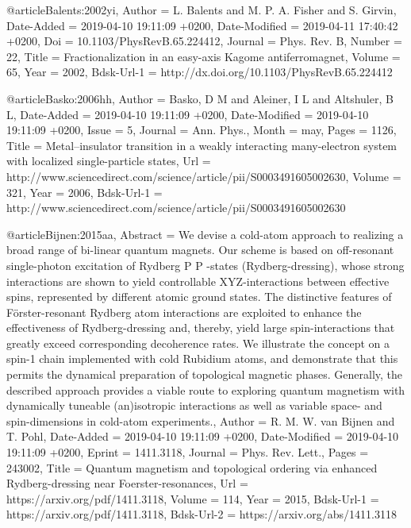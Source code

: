 \documentclass[epj,final]{svjour}
\begin{document}
{@article{Balents:2002yi,
	Author = {L. Balents and M. P. A. Fisher and S. Girvin},
	Date-Added = {2019-04-10 19:11:09 +0200},
	Date-Modified = {2019-04-11 17:40:42 +0200},
	Doi = {10.1103/PhysRevB.65.224412},
	Journal = {Phys. Rev. B},
	Number = {22},
	Title = {Fractionalization in an easy-axis Kagome antiferromagnet},
	Volume = {65},
	Year = {2002},
	Bdsk-Url-1 = {http://dx.doi.org/10.1103/PhysRevB.65.224412}}

@article{Basko:2006hh,
	Author = {Basko, D M and Aleiner, I L and Altshuler, B L},
	Date-Added = {2019-04-10 19:11:09 +0200},
	Date-Modified = {2019-04-10 19:11:09 +0200},
	Issue = {5},
	Journal = {Ann. Phys.},
	Month = may,
	Pages = {1126},
	Title = {{Metal--insulator transition in a weakly interacting many-electron system with localized single-particle states}},
	Url = {http://www.sciencedirect.com/science/article/pii/S0003491605002630},
	Volume = {321},
	Year = {2006},
	Bdsk-Url-1 = {http://www.sciencedirect.com/science/article/pii/S0003491605002630}}

@article{Bijnen:2015aa,
	Abstract = {We devise a cold-atom approach to realizing a broad range of bi-linear quantum magnets. Our scheme is based on off-resonant single-photon excitation of Rydberg P P -states (Rydberg-dressing), whose strong interactions are shown to yield controllable XYZ-interactions between effective spins, represented by different atomic ground states. The distinctive features of F{\"o}rster-resonant Rydberg atom interactions are exploited to enhance the effectiveness of Rydberg-dressing and, thereby, yield large spin-interactions that greatly exceed corresponding decoherence rates. We illustrate the concept on a spin-1 chain implemented with cold Rubidium atoms, and demonstrate that this permits the dynamical preparation of topological magnetic phases. Generally, the described approach provides a viable route to exploring quantum magnetism with dynamically tuneable (an)isotropic interactions as well as variable space- and spin-dimensions in cold-atom experiments.},
	Author = {R. M. W. van Bijnen and T. Pohl},
	Date-Added = {2019-04-10 19:11:09 +0200},
	Date-Modified = {2019-04-10 19:11:09 +0200},
	Eprint = {1411.3118},
	Journal = {Phys. Rev. Lett.},
	Pages = {243002},
	Title = {Quantum magnetism and topological ordering via enhanced Rydberg-dressing near Foerster-resonances},
	Url = {https://arxiv.org/pdf/1411.3118},
	Volume = {114},
	Year = {2015},
	Bdsk-Url-1 = {https://arxiv.org/pdf/1411.3118},
	Bdsk-Url-2 = {https://arxiv.org/abs/1411.3118}}

}
\end{document}

